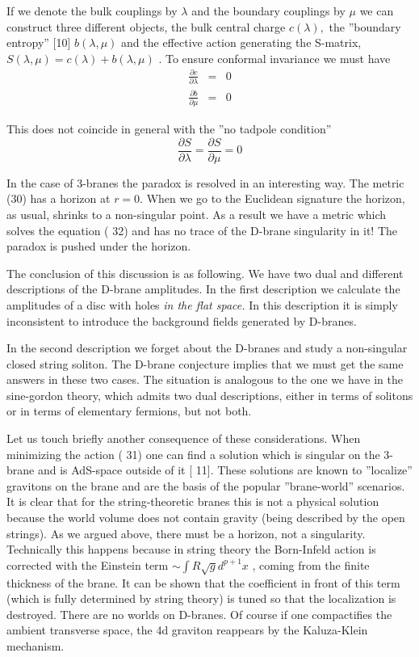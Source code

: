 \documentclass[a4paper,12pt]{article}
\begin{document}
If we denote the bulk couplings by $\lambda $ and the boundary couplings by $%
\mu $ we can construct three different objects, the bulk central charge $%
c\left( \lambda \right) ,$ the ''boundary entropy'' [10] $b\left( \lambda
,\mu \right) $ and the effective action generating the S-matrix, $S(\lambda
,\mu )=c\left( \lambda \right) +b\left( \lambda ,\mu \right) $ . To ensure
conformal invariance we must have 
\begin{eqnarray}
\frac{\partial c}{\partial \lambda } &=&0 \\
\frac{\partial b}{\partial \mu } &=&0
\end{eqnarray}

This does not coincide in general with the ''no tadpole condition'' 
\begin{equation}
\frac{\partial S}{\partial \lambda }=\frac{\partial S}{\partial \mu }=0
\end{equation}

In the case of 3-branes the paradox is resolved in an interesting way. The
metric (30) has a horizon at $r=0$. When we go to the Euclidean signature
the horizon, as usual, shrinks to a non-singular point. As a result we have
a metric which solves the equation ( 32) and has no trace of the D-brane
singularity in it! The paradox is pushed under the horizon.

The conclusion of this discussion is as following. We have two dual and
different descriptions of the D-brane amplitudes. In the first description
we calculate the amplitudes of a disc with holes \emph{in the flat space. }%
In this description it is simply inconsistent to introduce the background
fields generated by D-branes.

In the second description we forget about the D-branes and study a
non-singular closed string soliton. The D-brane conjecture implies that we
must get the same answers in these two cases. The situation is analogous to
the one we have in the sine-gordon theory, which admits two dual
descriptions, either in terms of solitons or in terms of elementary
fermions, but not both.

Let us touch briefly another consequence of these considerations. When
minimizing the action ( 31) one can find a solution which is singular on the
3-brane and is AdS-space outside of it [ 11]. These solutions are known to
''localize'' gravitons on the brane and are the basis of the popular
''brane-world'' scenarios. It is clear that for the string-theoretic branes
this is not a physical solution because the world volume does not contain
gravity (being described by the open strings). As we argued above, there
must be a horizon, not a singularity. Technically this happens because in
string theory the Born-Infeld action is corrected with the Einstein term $%
\sim \int R\sqrt{g}d^{p+1}x$ , coming from the finite thickness of the
brane. It can be shown that the coefficient in front of this term (which is
fully determined by string theory) is tuned so that the localization is
destroyed. There are no worlds on D-branes. Of course if one compactifies
the ambient transverse space, the 4d graviton reappears by the Kaluza-Klein
mechanism.
\end{document}
